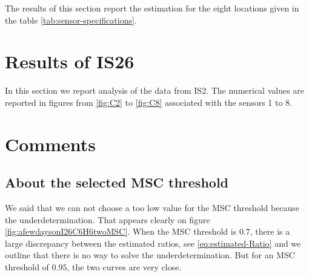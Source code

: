 The results of this section report the estimation for the eight locations given in the table \ref{tab:sensor-specifications}.


\section{Results of IS26}
In this section we report analysis of the data from IS2. The numerical values are reported in figures from \ref{fig:C2} to \ref{fig:C8} associated with the sensors 1 to 8.

 
  








\newpage\clearpage
\section{Comments}
\subsection{About the selected MSC threshold}
We said that we can not choose a too low value for the MSC threshold because the underdetermination. That appears clearly on figure \ref{fig:afewdaysonI26C6H6twoMSC}.
When the  MSC threshold is $0.7$, there is a large discrepancy between the estimated ratios, see \eqref{eq:estimated-Ratio} and we outline that there is no way to solve the underdetermination. But for an MSC threshold of $0.95$, the two curves are very close.


